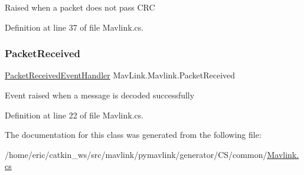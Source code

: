 Raised when a packet does not pass C\+RC 



Definition at line 37 of file Mavlink.\+cs.

\mbox{\label{classMavLink_1_1Mavlink_ae5657dc889b9cbc7ce2c03d1cd5f7e73}} 
\subsubsection{\texorpdfstring{PacketReceived}{PacketReceived}}
{\footnotesize\ttfamily \mbox{\hyperlink{namespaceMavLink_a78c17c9f049257b0626c8d377735666d}{Packet\+Received\+Event\+Handler}} Mav\+Link.\+Mavlink.\+Packet\+Received}



Event raised when a message is decoded successfully 



Definition at line 22 of file Mavlink.\+cs.



The documentation for this class was generated from the following file\+:\begin{DoxyCompactItemize}
\item 
/home/eric/catkin\+\_\+ws/src/mavlink/pymavlink/generator/\+C\+S/common/\mbox{\hyperlink{Mavlink_8cs}{Mavlink.\+cs}}\end{DoxyCompactItemize}
